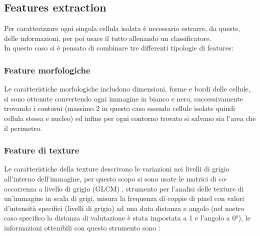 \documentclass[italian,10pt,a4paper]{article}
\begin{document}
		\subsection{Features extraction}
			Per caratterizzare ogni singola cellula isolata è necessario estrarre, da queste, delle informazioni, per poi usare il tutto allenando un classificatore.\\
			In questo caso si è pensato di combinare tre differenti tipologie di features:
			
				\subsubsection{Feature morfologiche}
					Le caratteristiche morfologiche includono dimensioni, forme e bordi delle cellule, si sono ottenute convertendo ogni immagine in bianco e nero, successivamente trovando i contorni (massimo 2 in questo caso essendo cellule isolate quindi cellula stessa e nucleo) ed infine per ogni contorno trovato si salvano sia l’area che il perimetro.
					
				\subsubsection{Feature di texture}
					Le caratteristiche della texture descrivono le variazioni nei livelli di grigio all'interno dell'immagine, per questo scopo si sono usate le matrici di co-occorrenza a livello di grigio (GLCM) \cite{liu_feature_2013}, strumento per l’analisi delle texture di un’immagine in scala di grigi, misura la frequenza di coppie di pixel con valori d’intensità specifici (livelli di grigio) ad una data distanza e angolo (nel nostro caso specifico la distanza di valutazione è stata impostata a 1 e l'angolo a 0°), le informazioni ottenibili con questo strumento sono :
					
\end{document}
